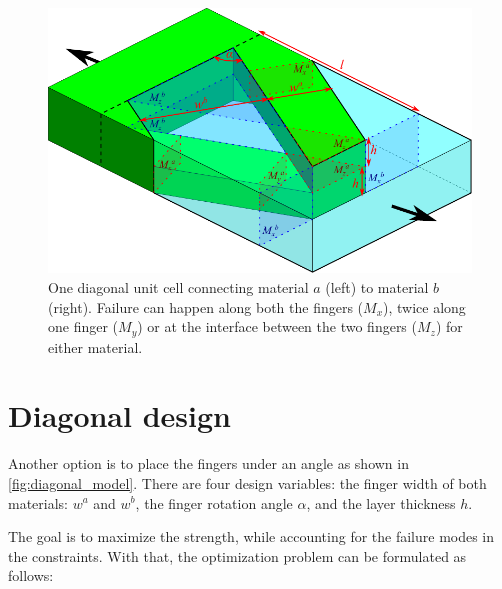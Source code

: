
\begin{figure}[H]
	\centering
	\includegraphics[width=\columnwidth]{sources/method/diagonal_model_v3.pdf}
	\caption{
		One diagonal unit cell connecting material $a$ (left) to material $b$ (right).
		Failure can happen along both the fingers ($M_x$), twice along one finger ($M_y$) or at the interface between the two fingers ($M_z$) for either material.}
	\label{fig:diagonal_model}
\end{figure}



\section{Diagonal design}

Another option is to place the fingers under an angle as shown in \autoref{fig:diagonal_model}.
There are four design variables: the finger width of both materials: $w^a$ and $w^b$, the finger rotation angle $\alpha$, and the layer thickness $h$.




The goal is to maximize the strength, while accounting for the failure modes in the constraints.
With that, the optimization problem can be formulated as follows:

